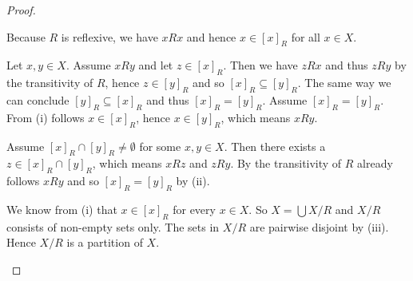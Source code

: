 \begin{proof}
    \begin{proofenumerate}
        \item Because $R$ is reflexive, we have $xRx$ and hence $x\in[x]_R$ for all $x\in X$.
        \item Let $x,y\in X$.
        \proofright Assume $xRy$ and let $z\in [x]_R$. Then we have $zRx$ and thus $zRy$ by the transitivity of $R$, hence $z\in [y]_R$ and so $[x]_R\subseteq [y]_R$. The same way we can conclude $[y]_R\subseteq [x]_R$ and thus $[x]_R=[y]_R$. \proofleft Assume $[x]_R=[y]_R$. From (i) follows $x\in [x]_R$, hence $x\in [y]_R$, which means $xRy$.
        \item Assume $[x]_R\cap [y]_R\neq\emptyset$ for some $x,y\in X$. Then there exists a $z\in [x]_R\cap[y]_R$, which means $xRz$ and $zRy$. By the transitivity of $R$ already follows $xRy$ and so $[x]_R=[y]_R$ by (ii).
        \item We know from (i) that $x\in[x]_R$ for every $x\in X$. So $X=\bigcup X/R$ and $X/R$ consists of non-empty sets only. The sets in $X/R$ are pairwise disjoint by (iii). Hence $X/R$ is a partition of $X$.
    \end{proofenumerate}
\end{proof}

